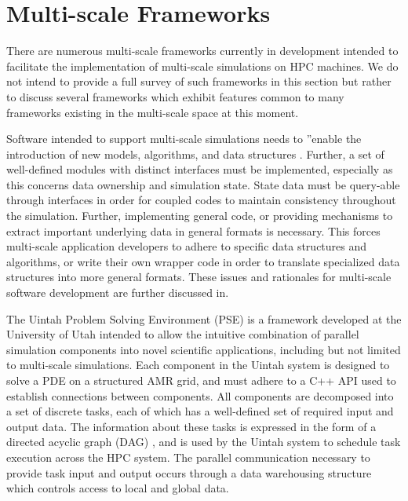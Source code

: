 \documentclass[review]{siamart1116}
\begin{document}
\section{Multi-scale Frameworks}\label{sec:frameworks}

There are numerous multi-scale frameworks currently in development intended to facilitate the implementation of multi-scale simulations on HPC machines. We do not intend to provide a full survey of such frameworks in this section but rather to discuss several frameworks which exhibit features common to many frameworks existing in the multi-scale space at this moment.

Software intended to support multi-scale simulations needs to ”enable the introduction of new models, algorithms, and data structures \cite{keyes2013multiphysics}. Further, a set of well-defined modules with distinct interfaces must be implemented, especially as this concerns data ownership and simulation state. State data must be query-able through interfaces in order for coupled codes to maintain consistency throughout the simulation. Further, implementing general code, or providing mechanisms to extract important underlying data in general formats is necessary. This forces multi-scale application developers to adhere to specific data structures and algorithms, or write their own wrapper code in order to translate specialized data structures into more general formats. These issues and rationales for multi-scale software development are further discussed in\cite{keyes2013multiphysics}.

The Uintah Problem Solving Environment (PSE) \cite{berzins2010uintah} is a framework developed at the University of Utah intended to allow the intuitive combination of parallel simulation components into novel scientific applications, including but not limited to multi-scale simulations. Each component in the Uintah system is designed to solve a PDE on a structured AMR grid, and must adhere to a C++ API used to establish connections between components. All components are decomposed into a set of discrete tasks, each of which has a well-defined set of required input and output data. The information about these tasks is expressed in the form of a directed acyclic graph (DAG) \cite{berzins2015extending}, and is used by the Uintah system to schedule task execution across the HPC system. The parallel communication necessary to provide task input and output occurs through a data warehousing structure which controls access to local and global data.
\end{document}
